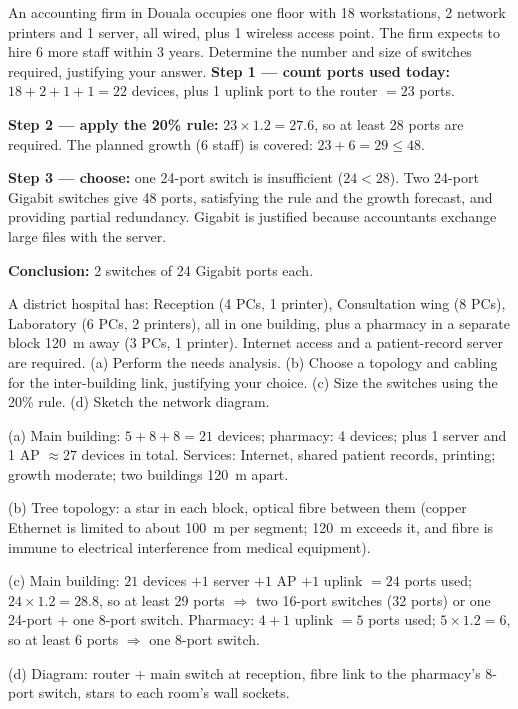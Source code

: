 \documentclass[11pt]{article}
\begin{document}
\begin{exoresolu}
An accounting firm in Douala occupies one floor with 18 workstations, 2 network printers and 1 server, all wired, plus 1 wireless access point. The firm expects to hire 6 more staff within 3 years. Determine the number and size of switches required, justifying your answer.
\tcblower
\textbf{Step 1 — count ports used today:} $18 + 2 + 1 + 1 = 22$ devices, plus 1 uplink port to the router $= 23$ ports.

\textbf{Step 2 — apply the 20\% rule:} $23 \times 1.2 = 27.6$, so at least 28 ports are required. The planned growth (6 staff) is covered: $23 + 6 = 29 \leq 48$.

\textbf{Step 3 — choose:} one 24-port switch is insufficient ($24 < 28$). Two 24-port Gigabit switches give 48 ports, satisfying the rule and the growth forecast, and providing partial redundancy. Gigabit is justified because accountants exchange large files with the server.

\textbf{Conclusion:} 2 switches of 24 Gigabit ports each.
\end{exoresolu}

\begin{exercice}
A district hospital has: Reception (4 PCs, 1 printer), Consultation wing (8 PCs), Laboratory (6 PCs, 2 printers), all in one building, plus a pharmacy in a separate block 120~m away (3 PCs, 1 printer). Internet access and a patient-record server are required. (a) Perform the needs analysis. (b) Choose a topology and cabling for the inter-building link, justifying your choice. (c) Size the switches using the 20\% rule. (d) Sketch the network diagram.
\end{exercice}

\begin{corrige}
(a) Main building: $5 + 8 + 8 = 21$ devices; pharmacy: 4 devices; plus 1 server and 1 AP $\approx 27$ devices in total. Services: Internet, shared patient records, printing; growth moderate; two buildings 120~m apart.

(b) Tree topology: a star in each block, optical fibre between them (copper Ethernet is limited to about 100~m per segment; 120~m exceeds it, and fibre is immune to electrical interference from medical equipment).

(c) Main building: $21$ devices $+ 1$ server $+ 1$ AP $+ 1$ uplink $= 24$ ports used; $24 \times 1.2 = 28.8$, so at least 29 ports $\Rightarrow$ two 16-port switches (32 ports) or one 24-port + one 8-port switch. Pharmacy: $4 + 1$ uplink $= 5$ ports used; $5 \times 1.2 = 6$, so at least 6 ports $\Rightarrow$ one 8-port switch.

(d) Diagram: router + main switch at reception, fibre link to the pharmacy's 8-port switch, stars to each room's wall sockets.
\end{corrige}
\end{document}
